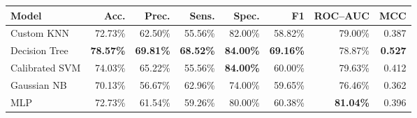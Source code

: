 \begin{tabular}{@{}lrrrrrrr@{}}
\toprule
Model & Acc. & Prec. & Sens. & Spec. & F1 & ROC--AUC & MCC \\
\midrule
Custom KNN & 72.73\% & 62.50\% & 55.56\% & 82.00\% & 58.82\% & 79.00\% & 0.387 \\
Decision Tree & \textbf{78.57\%} & \textbf{69.81\%} & \textbf{68.52\%} & \textbf{84.00\%} & \textbf{69.16\%} & 78.87\% & \textbf{0.527} \\
Calibrated SVM & 74.03\% & 65.22\% & 55.56\% & \textbf{84.00\%} & 60.00\% & 79.63\% & 0.412 \\
Gaussian NB & 70.13\% & 56.67\% & 62.96\% & 74.00\% & 59.65\% & 76.46\% & 0.362 \\
MLP & 72.73\% & 61.54\% & 59.26\% & 80.00\% & 60.38\% & \textbf{81.04\%} & 0.396 \\
\bottomrule
\end{tabular}
